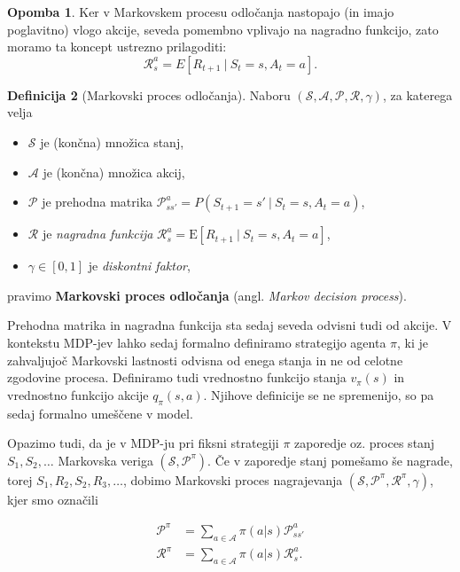 \documentclass[12pt,a4paper]{amsart}
\theoremstyle{definition} %
\newtheorem{definicija}{Definicija}[section]
\newtheorem{opomba}[definicija]{Opomba}
\theoremstyle{plain} %
\begin{document}
\begin{opomba}
    Ker v Markovskem procesu odločanja nastopajo (in imajo poglavitno) vlogo akcije, seveda pomembno 
    vplivajo na nagradno funkcijo, zato moramo ta koncept ustrezno prilagoditi:
    $$
    \mathcal{R}_s^a = E[R_{t+1}~|~S_{t} = s, A_t = a].
    $$
\end{opomba}

\begin{definicija}[Markovski proces odločanja]
    Naboru $(\mathcal{S}, \mathcal{A}, \mathcal{P}, \mathcal{R}, \gamma)$, za katerega velja
    \begin{itemize}
        \item $\mathcal{S}$ je (končna) množica stanj,
        \item $\mathcal{A}$ je (končna) množica akcij, 
        \item $\mathcal{P}$ je prehodna matrika $\mathcal{P}_{ss'}^a = P(S_{t+1} = s'~|~
                S_t = s, A_t = a)$, 
        \item $\mathcal{R}$ je \textit{nagradna funkcija} 
                $\mathcal{R}_s^a = \mathrm{E}[R_{t+1}~|~S_{t} = s, A_t = a]$, 
        \item $\gamma \in [0,1]$ je \textit{diskontni faktor}, 
    \end{itemize}
    pravimo \textbf{Markovski proces odločanja} (angl. \textit{Markov decision process}).
\end{definicija}

Prehodna matrika in nagradna funkcija sta sedaj seveda odvisni tudi od akcije. V kontekstu MDP-jev
lahko sedaj formalno definiramo strategijo agenta $\pi$, ki je zahvaljujoč Markovski lastnosti 
odvisna od enega stanja in ne od celotne zgodovine procesa. Definiramo tudi vrednostno funkcijo 
stanja $v_{\pi}(s)$ in vrednostno funkcijo akcije $q_{\pi}(s, a)$. Njihove definicije se ne 
spremenijo, so pa sedaj formalno umeščene v model.

Opazimo tudi, da je v MDP-ju pri fiksni strategiji $\pi$ zaporedje oz. proces stanj $S_1, S_2, 
\dots$ Markovska veriga $(\mathcal{S}, \mathcal{P}^\pi)$. Če v zaporedje stanj pomešamo še nagrade, 
torej $S_1, R_2, S_2, R_3, \dots$, dobimo Markovski proces nagrajevanja $(\mathcal{S}, 
\mathcal{P}^\pi, \mathcal{R}^\pi, \gamma)$, kjer smo označili

\begin{align*}
    \mathcal{P}^\pi &= \sum_{a \in \mathcal{A}} \pi(a|s) \mathcal{P}_{ss'}^a \\
    \mathcal{R}^\pi &= \sum_{a \in \mathcal{A}} \pi(a|s) \mathcal{R}_{s}^a. 
    \end{align*}
\end{document}
